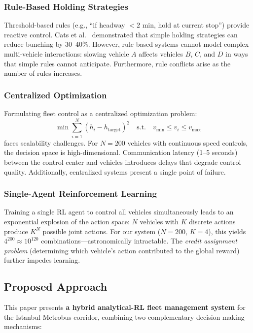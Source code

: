 \subsubsection{Rule-Based Holding Strategies}
Threshold-based rules (e.g., ``if headway $< 2$ min, hold at current stop'') provide reactive control. Cats et al.~\cite{cats2011impacts} demonstrated that simple holding strategies can reduce bunching by 30--40\%. However, rule-based systems cannot model complex multi-vehicle interactions: slowing vehicle $A$ affects vehicles $B$, $C$, and $D$ in ways that simple rules cannot anticipate. Furthermore, rule conflicts arise as the number of rules increases.

\subsubsection{Centralized Optimization}
Formulating fleet control as a centralized optimization problem:
\begin{equation}
    \min \sum_{i=1}^{N} \left(h_i - h_{\text{target}}\right)^2 \quad \text{s.t.} \quad v_{\min} \leq v_i \leq v_{\max}
\end{equation}
faces scalability challenges. For $N = 200$ vehicles with continuous speed controls, the decision space is high-dimensional. Communication latency (1--5 seconds) between the control center and vehicles introduces delays that degrade control quality. Additionally, centralized systems present a single point of failure.

\subsubsection{Single-Agent Reinforcement Learning}
Training a single RL agent to control all vehicles simultaneously leads to an exponential explosion of the action space: $N$ vehicles with $K$ discrete actions produce $K^N$ possible joint actions. For our system ($N = 200$, $K = 4$), this yields $4^{200} \approx 10^{120}$ combinations---astronomically intractable. The \textit{credit assignment problem} (determining which vehicle's action contributed to the global reward) further impedes learning.

\subsection{Proposed Approach}

This paper presents \textbf{a hybrid analytical-RL fleet management system} for the Istanbul Metrobus corridor, combining two complementary decision-making mechanisms:

